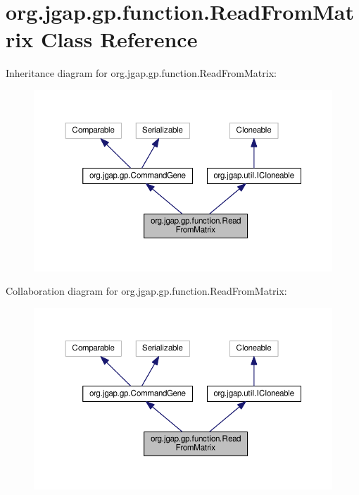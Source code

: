 \hypertarget{classorg_1_1jgap_1_1gp_1_1function_1_1_read_from_matrix}{\section{org.\-jgap.\-gp.\-function.\-Read\-From\-Matrix Class Reference}
\label{classorg_1_1jgap_1_1gp_1_1function_1_1_read_from_matrix}
}


Inheritance diagram for org.\-jgap.\-gp.\-function.\-Read\-From\-Matrix\-:
\nopagebreak
\begin{figure}[H]
\begin{center}
\leavevmode
\includegraphics[width=350pt]{classorg_1_1jgap_1_1gp_1_1function_1_1_read_from_matrix__inherit__graph}
\end{center}
\end{figure}


Collaboration diagram for org.\-jgap.\-gp.\-function.\-Read\-From\-Matrix\-:
\nopagebreak
\begin{figure}[H]
\begin{center}
\leavevmode
\includegraphics[width=350pt]{classorg_1_1jgap_1_1gp_1_1function_1_1_read_from_matrix__coll__graph}
\end{center}
\end{figure}

